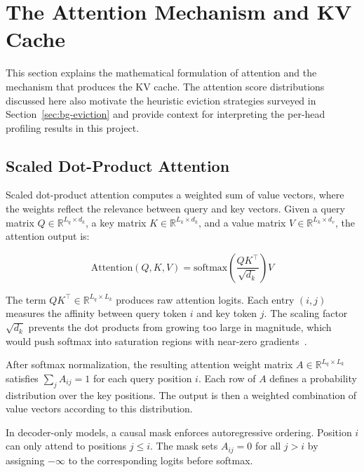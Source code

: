 \documentclass[
english,                 %
bibtex,                  %
]{kththesis}
\numberwithin{listing}{chapter}
\begin{document}
\section{The Attention Mechanism and KV Cache}
\label{sec:bg-attention-kv}

This section explains the mathematical formulation of attention and the mechanism that produces the \gls{KV} cache. The attention score distributions discussed here also motivate the heuristic eviction strategies surveyed in Section~\ref{sec:bg-eviction} and provide context for interpreting the per-head profiling results in this project.

\subsection{Scaled Dot-Product Attention}
\label{sec:bg-sdpa}

Scaled dot-product attention computes a weighted sum of value vectors, where the weights reflect the relevance between query and key vectors. Given a query matrix $Q \in \mathbb{R}^{L_q \times d_k}$, a key matrix $K \in \mathbb{R}^{L_k \times d_k}$, and a value matrix $V \in \mathbb{R}^{L_k \times d_v}$, the attention output is:

\begin{equation}
\label{eq:sdpa}
\text{Attention}(Q, K, V) = \text{softmax}\!\left(\frac{QK^\top}{\sqrt{d_k}}\right) V
\end{equation}

The term $QK^\top \in \mathbb{R}^{L_q \times L_k}$ produces raw attention logits. Each entry $(i, j)$ measures the affinity between query token $i$ and key token $j$. The scaling factor $\sqrt{d_k}$ prevents the dot products from growing too large in magnitude, which would push softmax into saturation regions with near-zero gradients~\cite{vaswani2017attention}.

After softmax normalization, the resulting attention weight matrix $A \in \mathbb{R}^{L_q \times L_k}$ satisfies $\sum_{j} A_{ij} = 1$ for each query position $i$. Each row of $A$ defines a probability distribution over the key positions. The output is then a weighted combination of value vectors according to this distribution.

In decoder-only models, a causal mask enforces autoregressive ordering. Position $i$ can only attend to positions $j \leq i$. The mask sets $A_{ij} = 0$ for all $j > i$ by assigning $-\infty$ to the corresponding logits before softmax.
\end{document}
